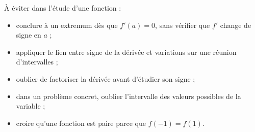 \begin{erreur}
	À éviter dans l'étude d'une fonction :
	\begin{itemize}
		\item conclure à un extremum dès que $f'(a) = 0$, sans vérifier que $f'$ change de signe en $a$ ;
		\item appliquer le lien entre signe de la dérivée et variations sur une réunion d'intervalles ;
		\item oublier de factoriser la dérivée avant d'étudier son signe ;
		\item dans un problème concret, oublier l'intervalle des valeurs possibles de la variable ;
		\item croire qu'une fonction est paire parce que $f(-1) = f(1)$.
	\end{itemize}
\end{erreur}

